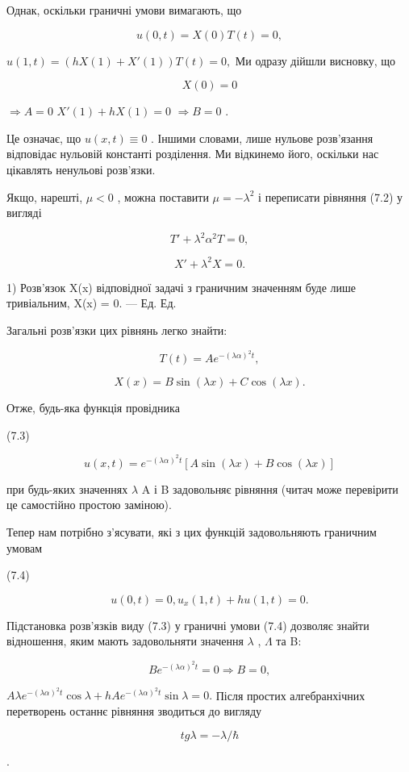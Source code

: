 \documentclass[
  ukrainian,
]{article}
\begin{document}
Однак, оскільки граничні умови вимагають, що

\[
u(0, t) = X(0) T(t) = 0,
\]

\(u(1, t) = (hX(1) + X'(1)) T(t) = 0,\) Ми одразу дійшли висновку, що

\[
X(0) = 0
\]

\(\Rightarrow A = 0\) \(X'(1) + hX(1) = 0\) \(\Rightarrow B = 0\) .

Це означає, що \(u(x, t) \equiv 0\) . Іншими словами, лише нульове
розв'язання відповідає нульовій константі розділення. Ми відкинемо його,
оскільки нас цікавлять ненульові розв'язки.

Якщо, нарешті, \(\mu < 0\) , можна поставити \(\mu = -\lambda^2\) і
переписати рівняння (7.2) у вигляді

\[
T' + \lambda^2 \alpha^2 T = 0,
\]

\[
X' + \lambda^2 X = 0.
\]

1) Розв'язок X(x) відповідної задачі з граничним значенням буде лише
тривіальним, X(x) = 0. --- Ед. Ед.

Загальні розв'язки цих рівнянь легко знайти:

\[
T(t) = Ae^{-(\lambda \alpha)^2 t},
\]

\[
X(x) = B\sin(\lambda x) + C\cos(\lambda x).
\]

Отже, будь-яка функція провідника

(7.3)

\[
u(x, t) = e^{-(\lambda \alpha)^2 t} [A \sin(\lambda x) + B \cos(\lambda x)]
\]

при будь-яких значеннях \(\lambda\) A і B задовольняє рівняння (читач
може перевірити це самостійно простою заміною).

Тепер нам потрібно з'ясувати, які з цих функцій задовольняють граничним
умовам

(7.4)

\[
u(0, t) = 0, u_x(1, t) + hu(1, t) = 0.
\]

Підстановка розв'язків виду (7.3) у граничні умови (7.4) дозволяє знайти
відношення, яким мають задовольняти значення \(\lambda\) , \(\Lambda\)
та B:

\[
Be^{-(\lambda\alpha)^2 t} = 0 \Rightarrow B = 0,
\]

\(A\lambda e^{-(\lambda\alpha)^2 t} \cos \lambda + hAe^{-(\lambda\alpha)^2 t} \sin \lambda = 0.\)
Після простих алгебранхічних перетворень останнє рівняння зводиться до
вигляду

\[
tg \lambda = -\lambda/\hbar
\]

.
\end{document}

